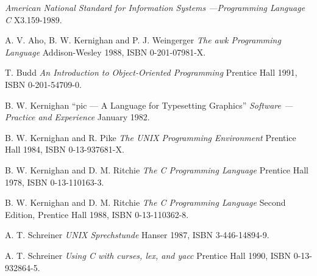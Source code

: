 \begin{thebibliography}{AWK88}

    \emph{American National Standard for Information Systems ---Programming
    Language C} X3.159-1989.

    A. V. Aho, B. W. Kernighan and P. J. Weingerger \emph{The awk
    Programming Language} Addison-Wesley 1988, ISBN 0-201-07981-X.

    T. Budd \emph{An Introduction to Object-Oriented Programming} Prentice
    Hall 1991, ISBN 0-201-54709-0.

    B. W. Kernighan ``pic --- A Language for Typesetting Graphics''
    \emph{Software --- Practice and Experience} January 1982.

    B. W. Kernighan and R. Pike \emph{The UNIX Programming Environment}
    Prentice Hall 1984, ISBN 0-13-937681-X.

    B. W. Kernighan and D. M. Ritchie \emph{The C Programming Language}
    Prentice Hall 1978, ISBN 0-13-110163-3.

    B. W. Kernighan and D. M. Ritchie \emph{The C Programming Language}
    Second Edition, Prentice Hall 1988, ISBN 0-13-110362-8.

    A. T. Schreiner \emph{UNIX Sprechstunde} Hanser 1987, ISBN
    3-446-14894-9.

    A. T. Schreiner \emph{Using C with curses, lex, and yacc} Prentice Hall
    1990, ISBN 0-13-932864-5.

\end{thebibliography}


